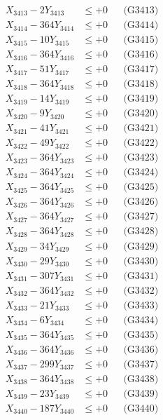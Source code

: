 \documentclass[a4paper,10pt]{article}
\begin{document}
{\begin{align}
X_{3413} - 2Y_{3413} &\leq +0 && \text{(G3413)} \\
X_{3414} - 364Y_{3414} &\leq +0 && \text{(G3414)} \\
X_{3415} - 10Y_{3415} &\leq +0 && \text{(G3415)} \\
X_{3416} - 364Y_{3416} &\leq +0 && \text{(G3416)} \\
X_{3417} - 51Y_{3417} &\leq +0 && \text{(G3417)} \\
X_{3418} - 364Y_{3418} &\leq +0 && \text{(G3418)} \\
X_{3419} - 14Y_{3419} &\leq +0 && \text{(G3419)} \\
X_{3420} - 9Y_{3420} &\leq +0 && \text{(G3420)} \\
\allowbreak
X_{3421} - 41Y_{3421} &\leq +0 && \text{(G3421)} \\
X_{3422} - 49Y_{3422} &\leq +0 && \text{(G3422)} \\
X_{3423} - 364Y_{3423} &\leq +0 && \text{(G3423)} \\
X_{3424} - 364Y_{3424} &\leq +0 && \text{(G3424)} \\
X_{3425} - 364Y_{3425} &\leq +0 && \text{(G3425)} \\
X_{3426} - 364Y_{3426} &\leq +0 && \text{(G3426)} \\
X_{3427} - 364Y_{3427} &\leq +0 && \text{(G3427)} \\
X_{3428} - 364Y_{3428} &\leq +0 && \text{(G3428)} \\
X_{3429} - 34Y_{3429} &\leq +0 && \text{(G3429)} \\
X_{3430} - 29Y_{3430} &\leq +0 && \text{(G3430)} \\
\allowbreak
X_{3431} - 307Y_{3431} &\leq +0 && \text{(G3431)} \\
X_{3432} - 364Y_{3432} &\leq +0 && \text{(G3432)} \\
X_{3433} - 21Y_{3433} &\leq +0 && \text{(G3433)} \\
X_{3434} - 6Y_{3434} &\leq +0 && \text{(G3434)} \\
X_{3435} - 364Y_{3435} &\leq +0 && \text{(G3435)} \\
X_{3436} - 364Y_{3436} &\leq +0 && \text{(G3436)} \\
X_{3437} - 299Y_{3437} &\leq +0 && \text{(G3437)} \\
X_{3438} - 364Y_{3438} &\leq +0 && \text{(G3438)} \\
X_{3439} - 23Y_{3439} &\leq +0 && \text{(G3439)} \\
X_{3440} - 187Y_{3440} &\leq +0 && \text{(G3440)} \\

\end{align}}
\end{document}
